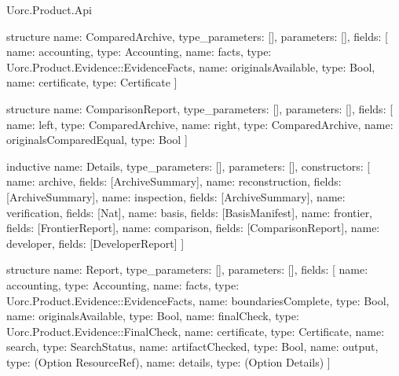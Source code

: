 \begin{lexlean}{Uorc.Product.Api}
\begin{semanticmodule}
structure{
  name: ComparedArchive,
  type_parameters: [],
  parameters: [],
  fields: [
    {name: accounting, type: Accounting},
    {name: facts, type: Uorc.Product.Evidence::EvidenceFacts},
    {name: originalsAvailable, type: Bool},
    {name: certificate, type: Certificate}
  ]
}

structure{
  name: ComparisonReport,
  type_parameters: [],
  parameters: [],
  fields: [
    {name: left, type: ComparedArchive},
    {name: right, type: ComparedArchive},
    {name: originalsComparedEqual, type: Bool}
  ]
}

inductive{
  name: Details,
  type_parameters: [],
  parameters: [],
  constructors: [
    {name: archive, fields: [ArchiveSummary]},
    {name: reconstruction, fields: [ArchiveSummary]},
    {name: inspection, fields: [ArchiveSummary]},
    {name: verification, fields: [Nat]},
    {name: basis, fields: [BasisManifest]},
    {name: frontier, fields: [FrontierReport]},
    {name: comparison, fields: [ComparisonReport]},
    {name: developer, fields: [DeveloperReport]}
  ]
}

structure{
  name: Report,
  type_parameters: [],
  parameters: [],
  fields: [
    {name: accounting, type: Accounting},
    {name: facts, type: Uorc.Product.Evidence::EvidenceFacts},
    {name: boundariesComplete, type: Bool},
    {name: originalsAvailable, type: Bool},
    {name: finalCheck, type: Uorc.Product.Evidence::FinalCheck},
    {name: certificate, type: Certificate},
    {name: search, type: SearchStatus},
    {name: artifactChecked, type: Bool},
    {name: output, type: (Option ResourceRef)},
    {name: details, type: (Option Details)}
  ]
}


\end{semanticmodule}
\end{lexlean}
